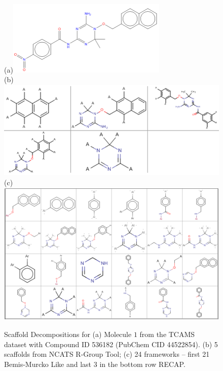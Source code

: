 \documentclass[journal=jacsat,manuscript=article]{achemso}
\begin{document}
\begin{figure}

(a)\includegraphics[width=3in]{fig/tcam1_mol.png}\\
\vspace{0.1in}
(b)\includegraphics[width=5in]{fig/tcam1_RGscaf.png}\\
\vspace{0.1in}
(c)\includegraphics[width=5in]{fig/tcam1_GSKframes.png}
\caption{Scaffold Decompositions for (a) Molecule $1$ from the TCAMS dataset with Compound ID 536182 (PubChem CID 44522854). (b) 5 scaffolds from NCATS R-Group Tool; (c) 24 frameworks -- first 21 Bemis-Murcko Like and last 3 in the bottom row RECAP.}
\label{fig:scafmethod}
\end{figure}
\end{document}
